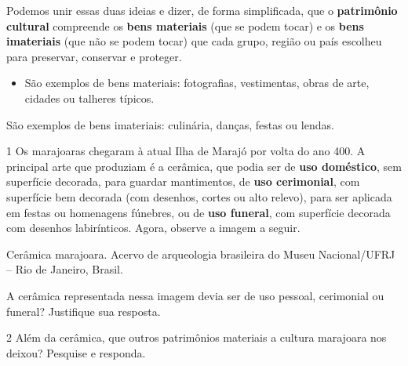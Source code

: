 \begin{escolha}
{Podemos unir essas duas ideias e dizer, de forma
simplificada, que o \textbf{patrimônio cultural} compreende os \textbf{bens materiais}
(que se podem tocar) e os \textbf{bens imateriais} (que não se podem tocar) que cada grupo,
região ou país escolheu para preservar, conservar e proteger.

\begin{itemize}
  \item São exemplos de bens materiais: fotografias, vestimentas, obras de arte,
cidades ou talheres típicos.
\end{itemize}
\item São exemplos de bens imateriais: culinária, danças,
festas ou lendas.}




\num{1} Os marajoaras chegaram à atual Ilha de Marajó por volta do ano 400. A principal arte que produziam é a cerâmica, que podia ser de \textbf{uso doméstico}, sem superfície decorada, para guardar mantimentos, de \textbf{uso cerimonial}, com superfície bem decorada (com desenhos, cortes ou alto relevo), para ser aplicada em festas ou homenagens fúnebres, ou de \textbf{uso funeral}, com superfície decorada com desenhos labirínticos. Agora, observe a imagem a seguir.

Cerâmica marajoara. Acervo de arqueologia brasileira do Museu
Nacional/UFRJ -- Rio de Janeiro, Brasil.

A cerâmica representada nessa imagem devia ser de uso pessoal, cerimonial ou funeral? Justifique sua resposta.



\num{2}  Além da cerâmica, que outros patrimônios materiais a cultura marajoara nos deixou? Pesquise e responda.




\end{escolha}
